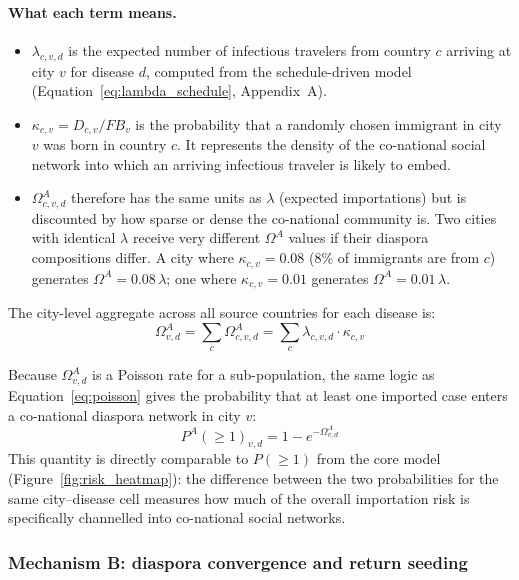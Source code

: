 \documentclass[12pt]{article}
\begin{document}
\paragraph{What each term means.}
\begin{itemize}
  \item $\lambda_{c,v,d}$ is the expected number of infectious travelers
    from country $c$ arriving at city $v$ for disease $d$, computed from the
    schedule-driven model (Equation~\ref{eq:lambda_schedule}, Appendix~A).
  \item $\kappa_{c,v} = D_{c,v}/\mathit{FB}_{v}$ is the probability that a
    randomly chosen immigrant in city $v$ was born in country $c$. It
    represents the density of the co-national social network into which
    an arriving infectious traveler is likely to embed.
  \item $\Omega^A_{c,v,d}$ therefore has the same units as $\lambda$ (expected
    importations) but is discounted by how sparse or dense the co-national
    community is. Two cities with identical $\lambda$ receive very different
    $\Omega^A$ values if their diaspora compositions differ. A city where
    $\kappa_{c,v} = 0.08$ (8\% of immigrants are from $c$) generates
    $\Omega^A = 0.08\,\lambda$; one where $\kappa_{c,v} = 0.01$ generates
    $\Omega^A = 0.01\,\lambda$.
\end{itemize}

The city-level aggregate across all source countries for each disease is:
\begin{equation}
  \Omega^A_{v,d} = \sum_c \Omega^A_{c,v,d}
    = \sum_c \lambda_{c,v,d} \cdot \kappa_{c,v}
\end{equation}

Because $\Omega^A_{v,d}$ is a Poisson rate for a sub-population, the
same logic as Equation~\ref{eq:poisson} gives the probability that at
least one imported case enters a co-national diaspora network in city $v$:
\begin{equation}
  P^A(\geq 1)_{v,d} = 1 - e^{-\Omega^A_{v,d}}
  \label{eq:probA}
\end{equation}
This quantity is directly comparable to $P(\geq 1)$ from the core model
(Figure~\ref{fig:risk_heatmap}): the difference between the two probabilities
for the same city--disease cell measures how much of the overall importation
risk is specifically channelled into co-national social networks.

\subsubsection*{Mechanism B: diaspora convergence and return seeding}
\end{document}
